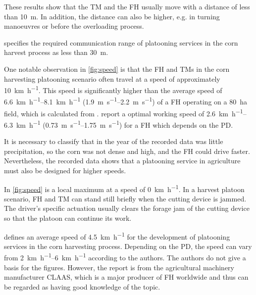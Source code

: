 These results show that the \ac{TM} and the \ac{FH} usually move with a distance of less than \SI{10}{\metre}.
In addition, the distance can also be higher, e.g. in turning manoeuvres or before the overloading process.

\textcite{smolnik_5g_2020} specifies the required communication range of platooning services in the corn harvest process
as less than \SI{30}{\metre}.

One notable observation in \autoref{fig:speed} is that the \ac{FH} and \ac{TM}s in the corn harvesting platooning scenario
often travel at a speed of approximately \SI{10}{\kilo\metre\per\hour}.
This speed is significantly higher than the average speed of \SIrange{6.6}{8.1}{\kilo\metre\per\hour} (\SIrange{1.9}{2.2}{\metre\per\second}) of a \ac{FH} operating on a \SI{80}{\hectare} field, which is calculated from \cite{faustzahlen2018}.
\textcite{nedelcu_influence_2020} report a optimal working speed of \SIrange{2.6}{6.3}{\kilo\metre\per\hour} (\SIrange{0.73}{1.75}{\metre\per\second}) for a \ac{FH} which depends on the \ac{PD}.


It is necessary to classify that in the year of the recorded data was little precipitation, so the corn was not dense and high,
and the \ac{FH} could drive faster.
Nevertheless, the recorded data shows that a platooning service in agriculture must also be designed for higher speeds.

In \autoref{fig:speed} is a local maximum at a speed of \SI{0}{\kilo\metre\per\hour}.
In a harvest platoon scenario, \ac{FH} and \ac{TM} can stand still briefly when the cutting device is jammed.
The driver's specific actuation usually clears the forage jam of the cutting device so that the platoon can continue its work.

\textcite{smolnik_5g_2020} defines an average speed of \SI{4.5}{\kilo\metre\per\hour} for the development of platooning
services in the corn harvesting process.
Depending on the \ac{PD}, the speed can vary from \SIrange{2}{6}{\kilo\metre\per\hour} according to the authors.
The authors do not give a basis for the figures.
However, the report is from the agricultural machinery manufacturer CLAAS,
which is a major producer of \ac{FH} worldwide and thus can be regarded as having good knowledge of the topic.

